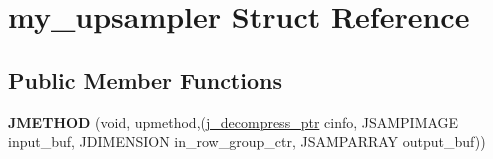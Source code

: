 \hypertarget{structmy__upsampler}{}\section{my\+\_\+upsampler Struct Reference}
\label{structmy__upsampler}
\subsection*{Public Member Functions}
\begin{DoxyCompactItemize}
\item 
{\bfseries J\+M\+E\+T\+H\+OD} (void, upmethod,(\hyperlink{structjpeg__decompress__struct}{j\+\_\+decompress\+\_\+ptr} cinfo,   J\+S\+A\+M\+P\+I\+M\+A\+GE input\+\_\+buf, J\+D\+I\+M\+E\+N\+S\+I\+ON in\+\_\+row\+\_\+group\+\_\+ctr,   J\+S\+A\+M\+P\+A\+R\+R\+AY output\+\_\+buf))\hypertarget{structmy__upsampler_a95ecca844733428e9c473b5255cdd671}{}\label{structmy__upsampler_a95ecca844733428e9c473b5255cdd671}

\end{DoxyCompactItemize}
